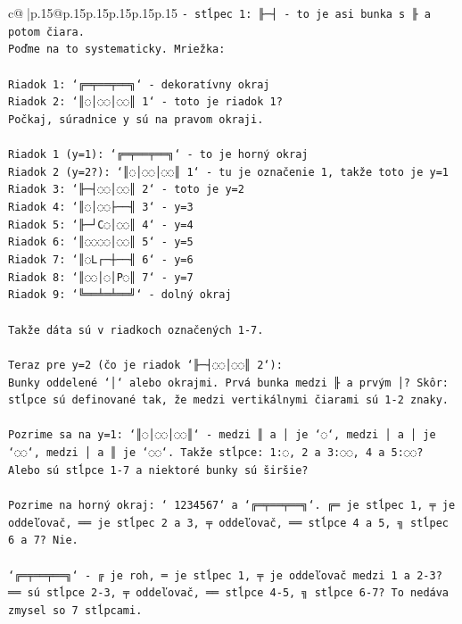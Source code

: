 \documentclass{article}
\begin{document}
{\begin{supertabular}{c@{$\;$}|p{.15\linewidth}@{}p{.15\linewidth}p{.15\linewidth}p{.15\linewidth}p{.15\linewidth}p{.15\linewidth}}
{{{\texttt{{-} stĺpec 1: ╟─┤ {-} to je asi bunka s ╟ a potom čiara. } \\
\texttt{Poďme na to systematicky. Mriežka:} \\
\\ 
\texttt{Riadok 1: `╔═╤══╤══╗` {-} dekoratívny okraj} \\
\texttt{Riadok 2: `║◌│◌◌│◌◌║ 1` {-} toto je riadok 1?} \\
\texttt{Počkaj, súradnice y sú na pravom okraji. } \\
\\ 
\texttt{Riadok 1 (y=1): `╔═╤══╤══╗` {-} to je horný okraj} \\
\texttt{Riadok 2 (y=2?): `║◌│◌◌│◌◌║ 1` {-} tu je označenie 1, takže toto je y=1} \\
\texttt{Riadok 3: `╟─┤◌◌│◌◌║ 2` {-} toto je y=2} \\
\texttt{Riadok 4: `║◌│◌◌├──╢ 3` {-} y=3} \\
\texttt{Riadok 5: `╟─┘C◌│◌◌║ 4` {-} y=4} \\
\texttt{Riadok 6: `║◌◌◌◌│◌◌║ 5` {-} y=5} \\
\texttt{Riadok 7: `║◌L┌─┼──╢ 6` {-} y=6} \\
\texttt{Riadok 8: `║◌◌│◌│P◌║ 7` {-} y=7} \\
\texttt{Riadok 9: `╚══╧═╧══╝` {-} dolný okraj} \\
\\ 
\texttt{Takže dáta sú v riadkoch označených 1{-}7.} \\
\\ 
\texttt{Teraz pre y=2 (čo je riadok `╟─┤◌◌│◌◌║ 2`):} \\
\texttt{Bunky oddelené `│` alebo okrajmi. Prvá bunka medzi ╟ a prvým │? Skôr: stĺpce sú definované tak, že medzi vertikálnymi čiarami sú 1{-}2 znaky.} \\
\\ 
\texttt{Pozrime sa na y=1: `║◌│◌◌│◌◌║` {-} medzi ║ a │ je `◌`, medzi │ a │ je `◌◌`, medzi │ a ║ je `◌◌`. Takže stĺpce: 1:◌, 2 a 3:◌◌, 4 a 5:◌◌? Alebo sú stĺpce 1{-}7 a niektoré bunky sú širšie?} \\
\\ 
\texttt{Pozrime na horný okraj: ` 1234567` a `╔═╤══╤══╗`. ╔═ je stĺpec 1, ╤ je oddeľovač, ══ je stĺpec 2 a 3, ╤ oddeľovač, ══ stĺpce 4 a 5, ╗ stĺpec 6 a 7? Nie.} \\
\\ 
\texttt{`╔═╤══╤══╗` {-} ╔ je roh, ═ je stĺpec 1, ╤ je oddeľovač medzi 1 a 2{-}3? ══ sú stĺpce 2{-}3, ╤ oddeľovač, ══ stĺpce 4{-}5, ╗ stĺpce 6{-}7? To nedáva zmysel so 7 stĺpcami.} \\
}}}
\end{supertabular}}
\end{document}
